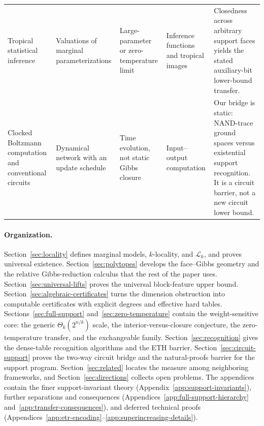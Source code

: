 \documentclass{article}
\newcommand{\LC}{\mathcal{L}}
\begin{document}
\begin{table}[!ht]
\begin{tabularx}{\textwidth}{
  @{}
  P{0.178\textwidth}
  P{0.137\textwidth}
  P{0.115\textwidth}
  P{0.180\textwidth}
  Y
  @{}
}
Tropical statistical inference
\cite{pachtersturmfels04,cuetomortonsturmfels10,montufarmorton17}
&
Valuations of marginal parameterizations
&
Large-parameter or zero-temperature limit
&
Inference functions and tropical images
&
Closedness across arbitrary support faces yields the stated auxiliary-bit
lower-bound transfer.
\\\addlinespace[2pt]

Clocked Boltzmann computation and conventional circuits
\cite{parberryschnitger89}
&
Dynamical network with an update schedule
&
Time evolution, not static Gibbs closure
&
Input--output computation
&
Our bridge is static: NAND-trace ground spaces versus existential support
recognition.  It is a circuit barrier, not a new circuit lower bound.
\\

\bottomrule
\end{tabularx}
\end{table}
\FloatBarrier

\paragraph{Organization.}
Section~\ref{sec:locality} defines marginal models, $k$-locality, and
$\LC_k$, and proves universal existence.  Section~\ref{sec:polytopes} develops
the face--Gibbs geometry and the relative Gibbs-reduction calculus that the
rest of the paper uses.
Section~\ref{sec:universal-lifts} proves the universal block-feature upper
bound.  Section~\ref{sec:algebraic-certificates} turns the dimension
obstruction into computable certificates with explicit degrees and effective
hard tables.  Sections~\ref{sec:full-support} and~\ref{sec:zero-temperature}
contain the weight-sensitive core: the generic $\Theta_k(2^{n/k})$ scale, the
interior-versus-closure conjecture, the zero-temperature transfer, and the
exchangeable family.  Section~\ref{sec:recognition} gives the dense-table
recognition algorithms and the ETH barrier.
Section~\ref{sec:circuit-support} proves the two-way circuit bridge and the
natural-proofs barrier for the support program.
Section~\ref{sec:related} locates the measure among neighboring frameworks,
and Section~\ref{sec:directions} collects open problems.  The appendices
contain the finer support-invariant theory
(Appendix~\ref{app:support-invariants}), further separations and consequences
(Appendices~\ref{app:full-support-hierarchy}
and~\ref{app:transfer-consequences}), and deferred technical proofs
(Appendices~\ref{app:etr-encoding}--\ref{app:superincreasing-details}).
\end{document}
